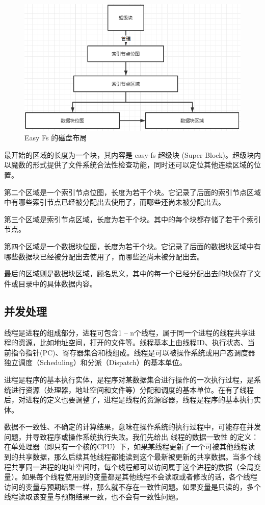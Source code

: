 \begin{figure}[htb]
    \figureCapSet
    \centering
    \includegraphics[width=.8\linewidth]{figure/c3/easyfsdevicemap.png}
    \caption{Easy Fs 的磁盘布局}
    \label{figure:c3easyfsdevicemap}
\end{figure}


最开始的区域的长度为一个块，其内容是 easy-fs 超级块 (Super Block)。超级块内以魔数的形式提供了文件系统合法性检查功能，同时还可以定位其他连续区域的位置。

第二个区域是一个索引节点位图，长度为若干个块。它记录了后面的索引节点区域中有哪些索引节点已经被分配出去使用了，而哪些还尚未被分配出去。

第三个区域是索引节点区域，长度为若干个块。其中的每个块都存储了若干个索引节点。

第四个区域是一个数据块位图，长度为若干个块。它记录了后面的数据块区域中有哪些数据块已经被分配出去使用了，而哪些还尚未被分配出去。

最后的区域则是数据块区域，顾名思义，其中的每一个已经分配出去的块保存了文件或目录中的具体数据内容。


\subsection{并发处理}

线程是进程的组成部分，进程可包含1 – n个线程，属于同一个进程的线程共享进程的资源，比如地址空间，打开的文件等。线程基本上由线程ID、执行状态、当前指令指针(PC)、寄存器集合和栈组成。线程是可以被操作系统或用户态调度器独立调度（Scheduling）和分派（Dispatch）的基本单位。

进程是程序的基本执行实体，是程序对某数据集合进行操作的一次执行过程，是系统进行资源（处理器，地址空间和文件等）分配和调度的基本单位。在有了线程后，对进程的定义也要调整了，进程是线程的资源容器，线程是程序的基本执行实体。

数据不一致性、不确定的计算结果，意味在操作系统的执行过程中，可能存在并发问题，并导致程序或操作系统执行失败。我们先给出 线程的数据一致性 的定义：在单处理器（即只有一个核的CPU）下，如果某线程更新了一个可被其他线程读到的共享数据，那么后续其他线程都能读到这个最新被更新的共享数据。当多个线程共享同一进程的地址空间时，每个线程都可以访问属于这个进程的数据（全局变量）。如果每个线程使用到的变量都是其他线程不会读取或者修改的话，各个线程访问的变量与预期结果一样，那么就不存在一致性问题。如果变量是只读的，多个线程读取该变量与预期结果一致，也不会有一致性问题。

